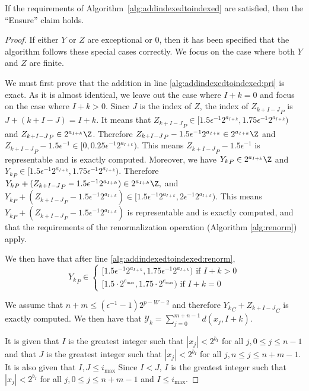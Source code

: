     \begin{lem}
      If the requirements of Algorithm~\ref{alg:addindexedtoindexed} are satisfied, then the ``Ensure'' claim holds.
      \label{lem:reduce}
    \end{lem}
    \begin{proof}
      If either $Y$ or $Z$ are exceptional or 0, then it has been specified that the algorithm follows these special cases correctly. We focus on the case where both $Y$ and $Z$ are finite.

      We must first prove that the addition in line \ref{alg:addindexedtoindexed:pri} is exact. As it is almost identical, we leave out the case where $I + k = 0$ and focus on the case where $I + k > 0$.
      Since $J$ is the index of $Z$, the index of ${Z_{k + I-J}}_P$ is
      $J + (k + I -J) = I + k$. It means that
      \(
        {Z_{k + I-J}}_P \in [1.5 \epsilon^{-1} 2^{a_{I+k}}, 1.75 \epsilon^{-1} 2^{a_{I+k}})
      \)
      and ${Z_{k + I-J}}_P \in 2^{a_{I+k}} \Z$.
      Therefore ${Z_{k + I-J}}_P - 1.5 \epsilon^{-1}  2^{a_{I+k}} \in 2^{a_{I+k}} \Z$
      and ${Z_{k + I-J}}_P - 1.5 \epsilon^{-1} \in [0, 0.25 \epsilon^{-1} 2^{a_{I+k}})$.
      This means ${Z_{k + I-J}}_P - 1.5 \epsilon^{-1}$ is representable and is
      exactly computed.
      Moreover, we have ${Y_{k}}_P \in 2^{a_{I+k}} \Z$ and
      \(
        {Y_{k}}_P \in [1.5 \epsilon^{-1} 2^{a_{I+k}}, 1.75 \epsilon^{-1} 2^{a_{I+k}})
      \).
      Therefore
      \(
        {Y_{k}}_P + ({Z_{k + I-J}}_P - 1.5 \epsilon^{-1}  2^{a_{I+k}})
          \in 2^{a_{I+k}} \Z,
      \)
      and
      \(
        {Y_{k}}_P + ({Z_{k + I-J}}_P - 1.5 \epsilon^{-1}  2^{a_{I+k}})
          \in [1.5 \epsilon^{-1} 2^{a_{I+k}}, 2 \epsilon^{-1} 2^{a_{I+k}})
      \).
      This means ${Y_{k}}_P + ({Z_{k + I-J}}_P - 1.5 \epsilon^{-1}  2^{a_{I+k}})$
      is representable and is exactly computed, and that the requirements of the renormalization operation (Algorithm \ref{alg:renorm}) apply.

      We then have that after line \ref{alg:addindexedtoindexed:renorm}, \[
          {Y_k}_P \in \begin{cases}[1.5  \epsilon^{-1} 2^{a_{I + k}}, 1.75  \epsilon^{-1} 2^{a_{I + k}}) \text{ if } I + k > 0 \\ [1.5 \cdot 2^{e_{\max}}, 1.75 \cdot 2^{e_{\max}}) \text{ if } I + k = 0\end{cases}
      \]

      We assume that $n + m \leq (\epsilon^{-1} - 1)2^{p - W - 2}$ and therefore ${Y_{k}}_C + {Z_{k + I-J}}_C$ is exactly computed. We then have that $\mathcal{Y}_k = \sum\limits_{j = 0}^{m + n - 1} d(x_j, I + k)$.

      It is given that $I$ is the greatest integer such that $|x_j| < 2^{b_I}$ for all $j, 0 \leq j \leq n - 1$ and that $J$ is the greatest integer such that $|x_j| < 2^{b_I}$ for all $j, n \leq j \leq n + m - 1$. It is also given that $I, J \leq i_{\max}$
      Since $I < J$, $I$ is the greatest integer such that $|x_j| < 2^{b_I}$ for all $j, 0 \leq j \leq n + m - 1$ and $I \leq i_{\max}$.
    \end{proof}
